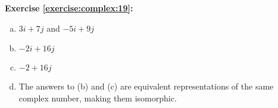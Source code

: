 \noindent\textbf{Exercise \ref{exercise:complex:19}:} %
\begin{enumerate}[(a)]
\item
$3i + 7j$ and $-5i + 9j$

\item
$-2i + 16j$

\item
$-2 + 16j$

\item
The answers to (b) and (c) are equivalent representations of the same complex number, making them isomorphic.
\end{enumerate}

